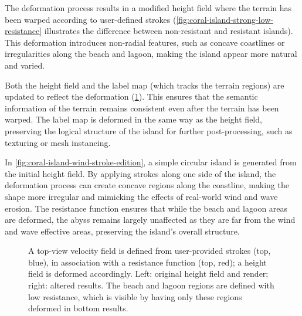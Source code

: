 The deformation process results in a modified height field where the terrain has been warped according to user-defined strokes (\cref{fig:coral-island-strong-low-resistance} illustrates the difference between non-resistant and resistant islands). This deformation introduces non-radial features, such as concave coastlines or irregularities along the beach and lagoon, making the island appear more natural and varied.

Both the height field and the label map (which tracks the terrain regions) are updated to reflect the deformation (\cref{fig:coral-island-wind-effect-result}). This ensures that the semantic information of the terrain remains consistent even after the terrain has been warped. The label map is deformed in the same way as the height field, preserving the logical structure of the island for further post-processing, such as texturing or mesh instancing.

In \cref{fig:coral-island-wind-stroke-edition}, a simple circular island is generated from the initial height field. By applying strokes along one side of the island, the deformation process can create concave regions along the coastline, making the shape more irregular and mimicking the effects of real-world wind and wave erosion. The resistance function ensures that while the beach and lagoon areas are deformed, the abyss remains largely unaffected as they are far from the wind and wave effective areas, preserving the island's overall structure.

\begin{figure}
    \caption[Island deformation on specific regions using resistance function]{A top-view velocity field is defined from user-provided strokes (top, blue), in association with a resistance function (top, red); a height field is deformed accordingly. Left: original height field and render; right: altered results. The beach and lagoon regions are defined with low resistance, which is visible by having only these regions deformed in bottom results.}
    \label{fig:coral-island-wind-effect-result}
\end{figure}


